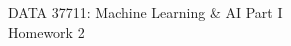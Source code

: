 \documentclass[11pt]{article}
\begin{document}
\begin{center}
{\large DATA 37711: Machine Learning \& AI Part I}\\[5pt]
{\LARGE Homework 2}
\end{center}

\clearpage

\clearpage

\end{document}
